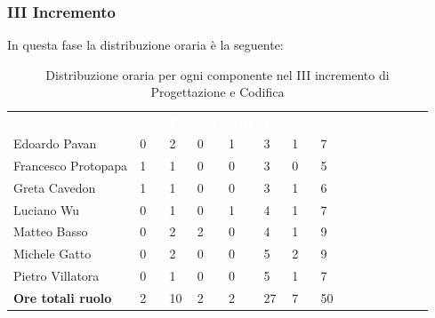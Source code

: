 \subsubsection{III Incremento}
In questa fase la distribuzione oraria è la seguente:
\begin{table}[H]
\begin{center}
\renewcommand{\arraystretch}{1.25}
\begin{tabular}{ m{}<{\centering}  m{}<{\centering} m{}<{\centering} m{}<{\centering}  m{}<{\centering}  m{}<{\centering}  m{}<{\centering}  m{}<{\centering}   }
	\rowcolor{darkblue}
	\textcolor{white}{\textbf{Componente}} &\textcolor{white}{\textbf{Re}}&\textcolor{white}{\textbf{Pt}}&\textcolor{white}{\textbf{An}}&\textcolor{white}{\textbf{Am}}&\textcolor{white}{\textbf{Pr}}&\textcolor{white}{\textbf{Ve}}&\textcolor{white}{\textbf{Ore complessive}}\\ 
	Edoardo Pavan & 0 & 2 & 0 & 1 & 3 & 1 & 7 \\	
	
	Francesco Protopapa & 1 & 1 & 0 & 0 & 3 & 0 & 5 \\

	Greta Cavedon & 1 & 1 & 0 & 0 & 3 & 1 & 6 \\
	
	Luciano Wu & 0 & 1 & 0 & 1 & 4 & 1 & 7 \\
	
	Matteo Basso & 0 & 2 & 2 & 0 & 4 & 1 & 9 \\
	
	Michele Gatto & 0 & 2 & 0 & 0 & 5 & 2 & 9 \\
	
	Pietro Villatora & 0 & 1 & 0 & 0 & 5 & 1 & 7 \\
	
	\textbf{Ore totali ruolo} & 2 & 10 & 2 & 2 & 27 & 7 & 50 \\

\end{tabular}
\caption{Distribuzione oraria per ogni componente nel III incremento di Progettazione e Codifica}
\end{center}
\end{table}

